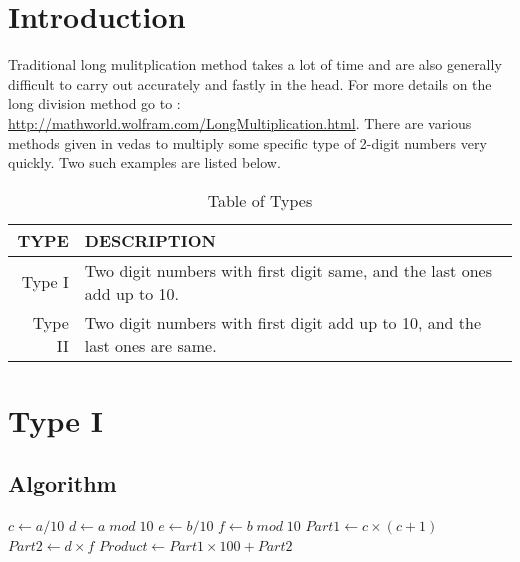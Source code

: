 \section{Introduction}
Traditional long mulitplication method \cite{google} takes a lot of time and are also generally difficult to carry out accurately and fastly in the head. For more details on the long division method go to : \url{http://mathworld.wolfram.com/LongMultiplication.html}. There are various methods given in vedas to multiply some specific type of 2-digit numbers very quickly. Two such examples are listed below. \cite{vedas} \cite{vedic}

\begin{table}[h]
	\begin{center}
		\begin{tabular}{|r | l|}
			\hline
			\textbf{TYPE} & \textbf{DESCRIPTION} \\
			\hline
			Type I & Two digit numbers with first digit same, and the last ones add up to 10. \\
			\hline
			Type II & Two digit numbers with first digit add up to 10, and the last ones are same. \\
			\hline
		\end{tabular}
		\caption{Table of Types}
	\end{center}
\end{table}

\section{Type I}
\subsection{Algorithm}
\label{Type I:algorithm}
	\begin{algorithm}
		\begin{algorithmic}
				\State $c \gets a/10$ 	
				\State $d \gets a \; mod \; 10$ 	
				\State $e \gets b/10$ 
				\State $f \gets b \; mod \; 10$ 	
					\State $Part1 \gets c \times (c+1)$
					\State $Part2 \gets d \times f$
					\State $Product \gets Part1 \times 100 + Part2$ 
				\Else
				\EndIf
			\EndProcedure
		\end{algorithmic}
	\end{algorithm}

